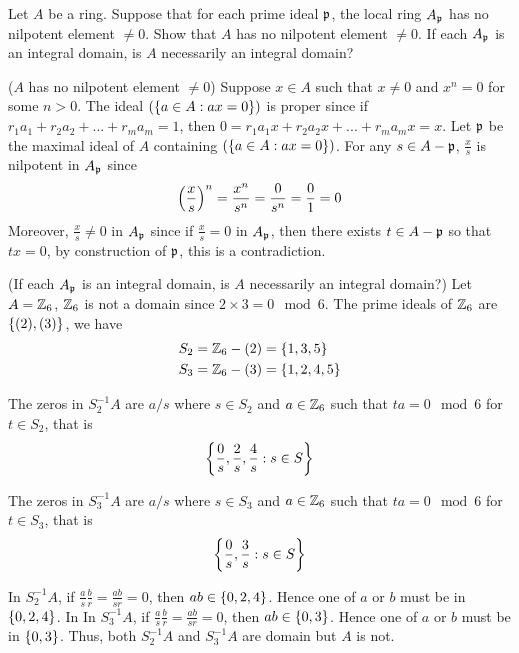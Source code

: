 \begin{problem}
	Let $A$ be a ring. Suppose that for each prime ideal $\mf{p}$, the local ring $A_\mf{p}$ has no nilpotent element $\neq 0$. Show that $A$ has no nilpotent element $\neq 0$. If each $A_\mf{p}$ is an integral domain, is $A$ necessarily an integral domain?
\end{problem}
\begin{longproof}
	($A$ has no nilpotent element $\neq 0$) Suppose $x \in A$ such that $x \neq 0$ and $x^n = 0$ for some $n > 0$. The ideal $(\set{a \in A: ax = 0})$ is proper since if $r_1 a_1 + r_2 a_2 + ... + r_m a_m = 1$, then $0 = r_1 a_1 x + r_2 a_2 x + ... + r_m a_m x = x$. Let $\mf{p}$ be the maximal ideal of $A$ containing $(\set{a \in A: ax = 0})$. For any $s \in A - \mf{p}$, $\frac{x}{s}$ is nilpotent in $A_\mf{p}$ since
	$$
		\tuple*{\frac{x}{s}}^n = \frac{x^n}{s^n} = \frac{0}{s^n} = \frac{0}{1} = 0
	$$
	Moreover, $\frac{x}{s} \neq 0$ in $A_\mf{p}$ since if $\frac{x}{s} = 0$ in $A_\mf{p}$, then there exists $t \in A - \mf{p}$ so that $tx = 0$, by construction of $\mf{p}$, this is a contradiction.
	
	(If each $A_\mf{p}$ is an integral domain, is $A$ necessarily an integral domain?)	Let $A = \Z_6$, $\Z_6$ is not a domain since $2 \times 3 = 0 \mod 6$. The prime ideals of $\Z_6$ are $\set{(2), (3)}$, we have
	\begin{align*}
		S_2 &= \Z_6 - (2) = \set{1, 3, 5} \\
		S_3 &= \Z_6 - (3) = \set{1, 2, 4, 5}
	\end{align*}
	
	The zeros in $S_2^{-1} A$ are $a / s$ where $s \in S_2$ and $a \in \Z_6$ such that $ta = 0 \mod 6$ for $t \in S_2$, that is
	$$
		\set*{\frac{0}{s}, \frac{2}{s}, \frac{4}{s}: s \in S}
	$$
	
	The zeros in $S_3^{-1} A$ are $a / s$ where $s \in S_3$ and $a \in \Z_6$ such that $ta = 0 \mod 6$ for $t \in S_3$, that is
	$$
		\set*{\frac{0}{s}, \frac{3}{s}: s \in S}
	$$
	
	In $S_2^{-1} A$, if $\frac{a}{s} \frac{b}{r} = \frac{ab}{sr} = 0$, then $ab \in \set{0, 2, 4}$. Hence one of $a$ or $b$ must be in $\set{0, 2, 4}$. In In $S_3^{-1} A$, if $\frac{a}{s} \frac{b}{r} = \frac{ab}{sr} = 0$, then $ab \in \set{0, 3}$. Hence one of $a$ or $b$ must be in $\set{0, 3}$. Thus, both $S_2^{-1} A$ and $S_3^{-1} A$ are domain but $A$ is not.
\end{longproof}

